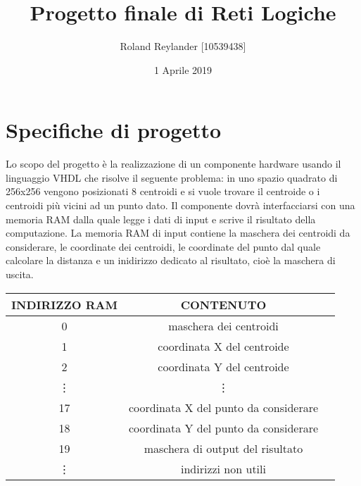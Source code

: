 \documentclass{article}
\title{Progetto finale di Reti Logiche}
\author{Roland Reylander [10539438]}
\date{1 Aprile 2019}
\begin{document}
\maketitle
\tableofcontents
\pagebreak

\section{Specifiche di progetto}
Lo scopo del progetto \`e la realizzazione di un componente hardware usando il linguaggio VHDL che risolve il seguente problema: in uno spazio quadrato di 256x256 vengono posizionati 8 centroidi e si vuole trovare il centroide o i centroidi più vicini ad un punto dato.
\newline
Il componente dovr\`{a} interfacciarsi con una memoria RAM dalla quale legge i dati di input e scrive il risultato della computazione. La memoria RAM di input contiene la maschera dei centroidi da considerare, le coordinate dei centroidi, le coordinate del punto dal quale calcolare la distanza e un inidirizzo dedicato al risultato, cioè la maschera di uscita.
\newline
\newline

\renewcommand{\arraystretch}{1.5}
\begin{tabular}{ |c|c|c| }
	\hline
	INDIRIZZO RAM & CONTENUTO \\ 
	\hline
	0 & maschera dei centroidi \\
	\hline
	1 & coordinata X del centroide \\
	\hline
	2 & coordinata Y del centroide \\
	\hline
	\vdots & \vdots \\
	\hline
	17 & coordinata X del punto da considerare \\
	\hline
	18 & coordinata Y del punto da considerare \\
	\hline
	19 & maschera di output del risultato \\
	\hline
	\vdots & indirizzi non utili \\
	\hline
\end{tabular}
\newline
\end{document}
